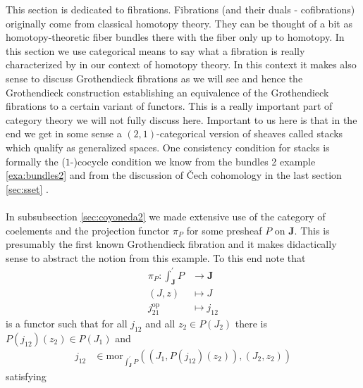 This section is dedicated to fibrations. Fibrations (and their duals - cofibrations) originally come from classical homotopy theory. They can be thought of a bit as homotopy-theoretic fiber bundles there with the fiber only up to homotopy. In this section we use categorical means to say what a fibration is really characterized by in our context of homotopy theory. In this context it makes also sense to discuss Grothendieck fibrations as we will see and hence the Grothendieck construction establishing an equivalence of the Grothendieck fibrations to a certain variant of functors. This is a really important part of category theory we will not fully discuss here. Important to us here is that in the end we get in some sense a $(2,1)$-categorical version of sheaves called stacks which qualify as generalized spaces. One consistency condition for stacks is formally the ($1$-)cocycle condition we know from the bundles 2 example \ref{exa:bundles2} and from the discussion of \v{C}ech cohomology in the last section \ref{sec:sset} .
\\\\
In subsubsection \ref{sec:coyoneda2} we made extensive use of the category of coelements and the projection functor $\pi_{P}$ for some presheaf $P$ on $\mathbf{J}$. This is presumably the first known Grothendieck fibration and it makes didactically sense to abstract the notion from this example. To this end note that
\begin{align*}
  \pi_{P}
  \colon
  \int_{\mathbf{J}}^{\prime}
  P
  &\rightarrow
  \mathbf{J}
  \\
  (J,z)
  &\mapsto
  J
  \\
  j_{21}^{\mathrm{op}}
  &\mapsto
  j_{12}
\end{align*}
is a functor such that for all $j_{12}$ and all $z_{2} \in P(J_{2})$ there is $P(j_{12})(z_{2}) \in P(J_{1})$ and
\begin{align*}
  j_{12}
  &\in
  \mathrm{mor}_{\int_{\mathbf{J}}^{\prime}P}
  \left(
    \left(
      J_{1},
      P(j_{12})(z_{2})
    \right),
    (J_{2},z_{2})
  \right)
\end{align*}
satisfying
